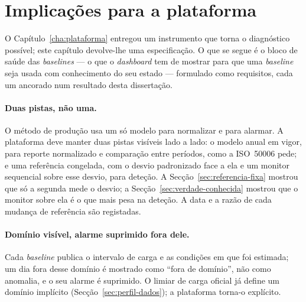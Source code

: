 \section{Implicações para a plataforma}
\label{sec:implicacoes-plataforma}

O Capítulo~\ref{cha:plataforma} entregou um instrumento que torna o
diagnóstico possível; este capítulo devolve-lhe uma especificação. O que se
segue é o bloco de saúde das \emph{baselines} --- o que o \emph{dashboard}
tem de mostrar para que uma \emph{baseline} seja usada com conhecimento do
seu estado --- formulado como requisitos, cada um ancorado num resultado
desta dissertação.

\paragraph{Duas pistas, não uma.} O método de produção usa um só modelo para
normalizar e para alarmar. A plataforma deve manter duas pistas visíveis
lado a lado: o modelo anual em vigor, para reporte normalizado e comparação
entre períodos, como a ISO~50006 pede; e uma referência congelada, com o
desvio padronizado face a ela e um monitor sequencial sobre esse desvio,
para deteção. A Secção~\ref{sec:referencia-fixa} mostrou que só a segunda
mede o desvio; a Secção~\ref{sec:verdade-conhecida} mostrou que o monitor
sobre ela é o que mais pesa na deteção. A data e a razão de cada mudança de
referência são registadas.

\paragraph{Domínio visível, alarme suprimido fora dele.} Cada
\emph{baseline} publica o intervalo de carga e as condições em que foi
estimada; um dia fora desse domínio é mostrado como ``fora de domínio'', não
como anomalia, e o seu alarme é suprimido. O limiar de carga oficial já
define um domínio implícito (Secção~\ref{sec:perfil-dados}); a plataforma
torna-o explícito.

